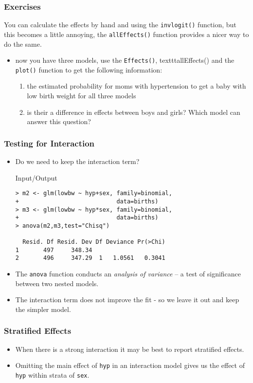 \begin{frame}[fragile]\frametitle{Exercises}
You can calculate the effects by hand and using the \texttt{invlogit()} function, but this becomes a little annoying, the \texttt{allEffects()} function provides a nicer way to do the same.
\begin{itemize}
\item now you have three models, use the \texttt{Effects()}, texttt{allEffects()} and the \texttt{plot()} function to get the following information:
  \begin{enumerate}
  \item the estimated probability for moms with hypertension to get a baby with low birth weight for all three models
  \item is their a difference in effects between boys and girls? Which model can answer this question?
  \end{enumerate}
\end{itemize}
\end{frame}


\begin{frame}[fragile]\frametitle{Testing for Interaction}
\begin{itemize}
\item Do we need to keep the interaction term? \footnotesize
  \begin{exampleblock}{Input/Output}
\begin{verbatim}
> m2 <- glm(lowbw ~ hyp+sex, family=binomial, 
+                            data=births)
> m3 <- glm(lowbw ~ hyp*sex, family=binomial, 
+                            data=births)
> anova(m2,m3,test="Chisq")

  Resid. Df Resid. Dev Df Deviance Pr(>Chi)
1       497     348.34                     
2       496     347.29  1   1.0561   0.3041
\end{verbatim}
  \end{exampleblock}
\normalsize
\item The \texttt{anova} function conducts an \emph{analysis of variance} -- a test of significance between two nested models. 
\item The interaction term does not improve the fit - so we leave it out and keep the simpler model.
\end{itemize}
\end{frame}


\begin{frame}[fragile]\frametitle{Stratified Effects}
\begin{itemize}
\item When there is a strong interaction it may be best to report stratified effects. 
\item Omitting the main effect of \texttt{hyp} in an interaction model gives us the effect of \texttt{hyp} within strata of \texttt{sex}.\scriptsize
\end{itemize}
\end{frame}

